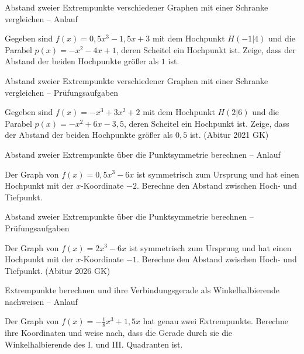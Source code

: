 \begin{aufgabe}{Abstand zweier Extrempunkte verschiedener Graphen mit einer Schranke vergleichen – Anlauf}
\begin{teile}
\teil Gegeben sind $f(x) = 0{,}5x^3 - 1{,}5x + 3$ mit dem Hochpunkt $H(-1 | 4)$ und die Parabel $p(x) = -x^2 - 4x + 1$, deren Scheitel ein Hochpunkt ist. Zeige, dass der Abstand der beiden Hochpunkte größer als $1$ ist.
\end{teile}
\end{aufgabe}

\begin{aufgabe}{Abstand zweier Extrempunkte verschiedener Graphen mit einer Schranke vergleichen – Prüfungsaufgaben}
\begin{teile}
\teil Gegeben sind $f(x) = -x^3 + 3x^2 + 2$ mit dem Hochpunkt $H(2 | 6)$ und die Parabel $p(x) = -x^2 + 6x - 3{,}5$, deren Scheitel ein Hochpunkt ist. Zeige, dass der Abstand der beiden Hochpunkte größer als $0{,}5$ ist. \hfill (Abitur 2021 GK)
\end{teile}
\end{aufgabe}

\begin{aufgabe}{Abstand zweier Extrempunkte über die Punktsymmetrie berechnen – Anlauf}
\begin{teile}
\teil Der Graph von $f(x) = 0{,}5x^3 - 6x$ ist symmetrisch zum Ursprung und hat einen Hochpunkt mit der $x$-Koordinate $-2$. Berechne den Abstand zwischen Hoch- und Tiefpunkt.
\end{teile}
\end{aufgabe}

\begin{aufgabe}{Abstand zweier Extrempunkte über die Punktsymmetrie berechnen – Prüfungsaufgaben}
\begin{teile}
\teil Der Graph von $f(x) = 2x^3 - 6x$ ist symmetrisch zum Ursprung und hat einen Hochpunkt mit der $x$-Koordinate $-1$. Berechne den Abstand zwischen Hoch- und Tiefpunkt. \hfill (Abitur 2026 GK)
\end{teile}
\end{aufgabe}

\begin{aufgabe}{Extrempunkte berechnen und ihre Verbindungsgerade als Winkelhalbierende nachweisen – Anlauf}
\begin{teile}
\teil Der Graph von $f(x) = -\frac{1}{8}x^3 + 1{,}5x$ hat genau zwei Extrempunkte. Berechne ihre Koordinaten und weise nach, dass die Gerade durch sie die Winkelhalbierende des I. und III. Quadranten ist.
\end{teile}
\end{aufgabe}

